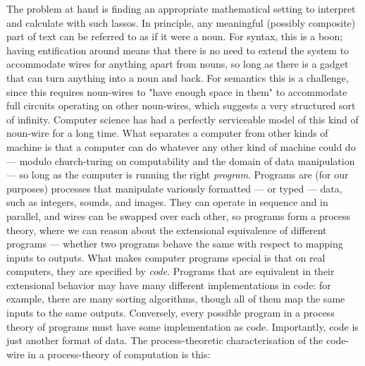 The problem at hand is finding an appropriate mathematical setting to interpret and calculate with such lassos. In principle, any meaningful (possibly composite) part of text can be referred to as if it were a noun. For syntax, this is a boon; having entification around means that there is no need to extend the system to accommodate wires for anything apart from nouns, so long as there is a gadget that can turn anything into a noun and back. For semantics this is a challenge, since this requires noun-wires to "have enough space in them" to accommodate full circuits operating on other noun-wires, which suggests a very structured sort of infinity. Computer science has had a perfectly serviceable model of this kind of noun-wire for a long time. What separates a computer from other kinds of machine is that a computer can do whatever any other kind of machine could do --- modulo church-turing on computability and the domain of data manipulation --- so long as the computer is running the right \emph{program}. Programs are (for our purposes) processes that manipulate variously formatted --- or typed --- data, such as integers, sounds, and images. They can operate in sequence and in parallel, and wires can be swapped over each other, so programs form a process theory, where we can reason about the extensional equivalence of different programs --- whether two programs behave the same with respect to mapping inputs to outputs. What makes computer programs special is that on real computers, they are specified by \emph{code}. Programs that are equivalent in their extensional behavior may have many different implementations in code: for example, there are many sorting algorithms, though all of them map the same inputs to the same outputs. Conversely, every possible program in a process theory of programs must have some implementation as code. Importantly, code is just another format of data. The process-theoretic characterisation of the code-wire in a process-theory of computation is this:

